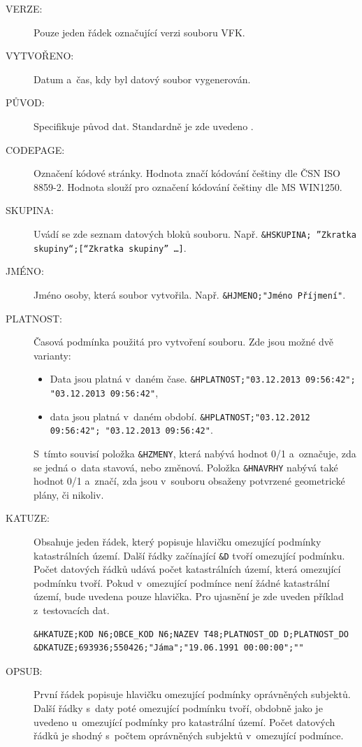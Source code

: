 \documentclass[a4paper,12pt,oneside]{book}
\begin{document}
\begin{description}
 \item[VERZE:] Pouze jeden řádek označující verzi souboru VFK.
 \item[VYTVOŘENO:] Datum a~čas, kdy byl datový soubor vygenerován.
 \item[PŮVOD:] Specifikuje původ dat. Standardně je zde uvedeno .
 \item[CODEPAGE:] Označení kódové stránky. Hodnota  značí kódování češtiny dle ČSN ISO 8859-2. Hodnota  slouží pro označení kódování češtiny dle MS WIN1250.
 \item[SKUPINA:] Uvádí se zde seznam datových bloků souboru. Např. \texttt{\&HSKUPINA; ”Zkratka skupiny“;[“Zkratka skupiny” \dots]}.
 \item[JMÉNO:] Jméno osoby, která soubor vytvořila. Např. \texttt{\&HJMENO;"Jméno Příjmení"}.
 \item[PLATNOST:] Časová podmínka použitá pro vytvoření souboru. Zde jsou možné dvě varianty:
 
 \begin{itemize}
  \item Data jsou platná v~daném čase. \texttt{\&HPLATNOST;"03.12.2013 09:56:42"; "03.12.2013 09:56:42"},
  \item data jsou platná v~daném období. \texttt{\&HPLATNOST;"03.12.2012 09:56:42"; "03.12.2013 09:56:42"}.
 \end{itemize}
 
 S~tímto souvisí položka \texttt{\&HZMENY}, která nabývá hodnot 0/1 a~označuje, zda se jedná o~data stavová, nebo změnová. Položka \texttt{\&HNAVRHY} nabývá také hodnot 0/1 a~značí, zda jsou v~souboru obsaženy potvrzené geometrické plány, či nikoliv.
 
 \item[KATUZE:] Obsahuje jeden řádek, který popisuje hlavičku omezující podmínky katastrálních území. Další řádky začínající \texttt{\&D} tvoří omezující podmínku. Počet datových řádků udává počet katastrálních území, která omezující podmínku tvoří. Pokud v~omezující podmínce není žádné katastrální území, bude uvedena pouze hlavička. Pro ujasnění je zde uveden příklad z~testovacích dat.
 
 \begin{lstlisting}
&HKATUZE;KOD N6;OBCE_KOD N6;NAZEV T48;PLATNOST_OD D;PLATNOST_DO
&DKATUZE;693936;550426;"Jáma";"19.06.1991 00:00:00";""
 \end{lstlisting}

 \item[OPSUB:] První řádek popisuje hlavičku omezující podmínky oprávněných subjektů. Další řádky s~daty poté omezující podmínku tvoří, obdobně jako je uvedeno u~omezující podmínky pro katastrální území. Počet datových řádků je shodný s~počtem oprávněných subjektů v~omezující podmínce.
 

\end{description}
\end{document}
